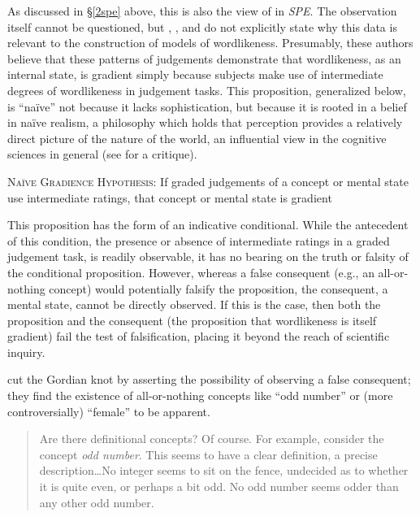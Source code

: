 As discussed in \S\ref{2spe} above, this is also the view of \citeauthor{SPE} in \emph{SPE}. The observation itself cannot be questioned, but \citeauthor{SPE}, \citeauthor{Hayes2008a}, and \citeauthor{Albright2009a} do not explicitly state why this data is relevant to the construction of models of wordlikeness. Presumably, these authors believe that these patterns of judgements demonstrate that wordlikeness, as an internal state, is gradient simply because subjects make use of intermediate degrees of wordlikeness in judgement tasks. This proposition, generalized below, is ``naïve'' not because it lacks sophistication, but because it is rooted in a belief in naïve realism, a philosophy which holds that perception provides a relatively direct picture of the nature of the world, an influential view in the cognitive sciences in general (see \citealt{Fodor1981a} for a critique).

\begin{unlabeledexample}
\textsc{Naïve Gradience Hypothesis}: If graded judgements of a concept or mental state use intermediate ratings, that concept or mental state is gradient
\end{unlabeledexample}

This proposition has the form of an indicative conditional. While the antecedent of this condition, the presence or absence of intermediate ratings in a graded judgement task, is readily observable, it has no bearing on the truth or falsity of the conditional proposition. However, whereas a false consequent (e.g., an all-or-nothing concept) would potentially falsify the proposition, the consequent, a mental state, cannot be directly observed. If this is the case, then both the proposition and the consequent (the proposition that wordlikeness is itself gradient) fail the test of falsification, placing it beyond the reach of scientific inquiry.

\citet{Armstrong1983} cut the Gordian knot by asserting the possibility of observing a false consequent; they find the existence of all-or-nothing concepts like ``odd number'' or (more controversially) ``female'' to be apparent.

\begin{quote}
Are there definitional concepts? Of course. For example, consider the concept \emph{odd number}. This seems to have a clear definition, a precise description\ldots{}No integer seems to sit on the fence, undecided as to whether it is quite even, or perhaps a bit odd. No odd number seems odder than any other odd number. \citep[274]{Armstrong1983}
\end{quote}

